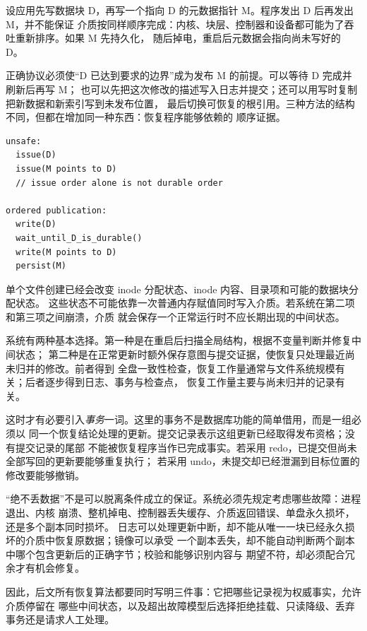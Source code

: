 设应用先写数据块 D，再写一个指向 D 的元数据指针 M。程序发出 D 后再发出 M，并不能保证
介质按同样顺序完成：内核、块层、控制器和设备都可能为了吞吐重新排序。如果 M 先持久化，
随后掉电，重启后元数据会指向尚未写好的 D。

正确协议必须使“D 已达到要求的边界”成为发布 M 的前提。可以等待 D 完成并刷新后再写 M；
也可以先把这次修改的描述写入日志并提交；还可以用写时复制把新数据和新索引写到未发布位置，
最后切换可恢复的根引用。三种方法的结构不同，但都在增加同一种东西：恢复程序能够依赖的
顺序证据。

\begin{lstlisting}
unsafe:
  issue(D)
  issue(M points to D)
  // issue order alone is not durable order

ordered publication:
  write(D)
  wait_until_D_is_durable()
  write(M points to D)
  persist(M)
\end{lstlisting}


单个文件创建已经会改变 inode 分配状态、inode 内容、目录项和可能的数据块分配状态。
这些状态不可能依靠一次普通内存赋值同时写入介质。若系统在第二项和第三项之间崩溃，介质
就会保存一个正常运行时不应长期出现的中间状态。

系统有两种基本选择。第一种是在重启后扫描全局结构，根据不变量判断并修复中间状态；
第二种是在正常更新时额外保存意图与提交证据，使恢复只处理最近尚未归并的修改。前者得到
全盘一致性检查，恢复工作量通常与文件系统规模有关；后者逐步得到日志、事务与检查点，
恢复工作量主要与尚未归并的记录有关。

这时才有必要引入\emph{事务}一词。这里的事务不是数据库功能的简单借用，而是一组必须以
同一个恢复结论处理的更新。提交记录表示这组更新已经取得发布资格；没有提交记录的尾部
不能被恢复程序当作已完成事实。若采用 redo，已提交但尚未全部写回的更新要能够重复执行；
若采用 undo，未提交却已经泄漏到目标位置的修改要能够撤销。


“绝不丢数据”不是可以脱离条件成立的保证。系统必须先规定考虑哪些故障：进程退出、内核
崩溃、整机掉电、控制器丢失缓存、介质返回错误、单盘永久损坏，还是多个副本同时损坏。
日志可以处理更新中断，却不能从唯一一块已经永久损坏的介质中恢复原数据；镜像可以承受
一个副本丢失，却不能自动判断两个副本中哪个包含更新后的正确字节；校验和能够识别内容与
期望不符，却必须配合冗余才有机会修复。

因此，后文所有恢复算法都要同时写明三件事：它把哪些记录视为权威事实，允许介质停留在
哪些中间状态，以及超出故障模型后选择拒绝挂载、只读降级、丢弃事务还是请求人工处理。

